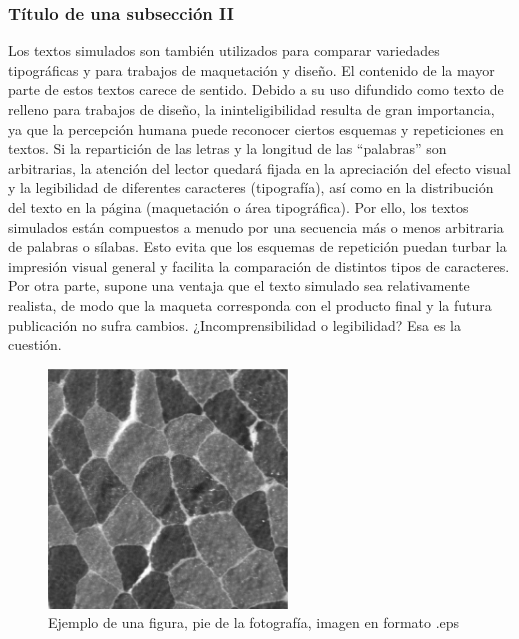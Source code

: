 \documentclass[journal]{IEEEtran} %
\begin{document}
\subsubsection{Título de una subsección II}
Los textos simulados son también utilizados para comparar variedades tipográficas y para trabajos de maquetación y diseño. El contenido de la mayor parte de estos textos carece de sentido. Debido a su uso difundido como texto de relleno para trabajos de diseño, la ininteligibilidad resulta de gran importancia, ya que la percepción humana puede reconocer ciertos esquemas y repeticiones en textos. Si la repartición de las letras y la longitud de las “palabras” son arbitrarias, la atención del lector quedará fijada en la apreciación del efecto visual y la legibilidad de diferentes caracteres (tipografía), así como en la distribución del texto en la página (maquetación o área tipográfica). Por ello, los textos simulados están compuestos a menudo por una secuencia más o menos arbitraria de palabras o sílabas. Esto evita que los esquemas de repetición puedan turbar la impresión visual general y facilita la comparación de distintos tipos de caracteres. Por otra parte, supone una ventaja que el texto simulado sea relativamente realista, de modo que la maqueta corresponda con el producto final y la futura publicación no sufra cambios.
¿Incomprensibilidad o legibilidad? Esa es la cuestión.



\begin{figure}
  \centering
  \includegraphics[width=2.5in]{./img/MUSCLEorig.eps}
  \caption{Ejemplo de una figura, pie de la fotografía, imagen en formato .eps}
  \label{fig:fig_sim}
\end{figure}
\end{document}
